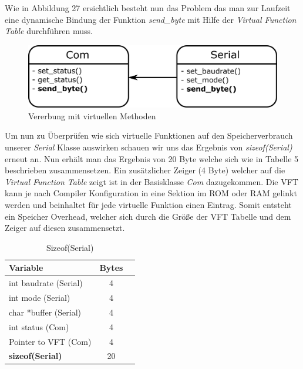 \documentclass[MES,Master,ngerman]{twbook}%
\begin{document}
Wie in Abbildung 27 ersichtlich besteht nun das Problem das man zur Laufzeit eine dynamische Bindung der Funktion \textit{send\_byte} mit Hilfe der \textit{Virtual Function Table} durchführen muss. 

\begin{figure}[h]
	\centering
	\includegraphics[scale=0.65]{../Grafiken/Virtuelle_Funktionen.png}
	\caption{Vererbung mit virtuellen Methoden}
	\label{fig:35}
\end{figure}

Um nun zu Überprüfen wie sich virtuelle Funktionen auf den Speicherverbrauch unserer \textit{Serial} Klasse auswirken schauen wir uns das Ergebnis von \textit{sizeof(Serial)} erneut an. Nun erhält man das Ergebnis von 20 Byte welche sich wie in Tabelle 5 beschrieben zusammensetzen. Ein zusätzlicher Zeiger (4 Byte) welcher auf die \textit{Virtual Function Table} zeigt ist in der Basisklasse \textit{Com} dazugekommen. Die VFT kann je nach Compiler Konfiguration in eine Sektion im ROM oder RAM gelinkt werden und beinhaltet für jede virtuelle Funktion einen Eintrag. Somit entsteht ein Speicher Overhead, welcher sich durch die Größe der VFT Tabelle und dem Zeiger auf diesen zusammensetzt. 

\begin{table}[!htb]
	\centering
	\begin{tabular}{| l | c | r |}
		\hline
		\textbf{Variable}   & \textbf{Bytes}    \\ \hline
		int baudrate (Serial)        & 4				    \\ \hline
		int mode (Serial)            & 4 	    		\\ \hline
		char *buffer (Serial)       & 4		            \\ \hline
		int status (Com)       & 4  			    \\ \hline
		Pointer to VFT (Com)       & 4  			    \\ \hline
		\textbf{sizeof(Serial)} & 20 \\ \hline
		
		
	\end{tabular}
	
	\caption{Sizeof(Serial)}
	\label{tbl:5}
\end{table}
\end{document}
